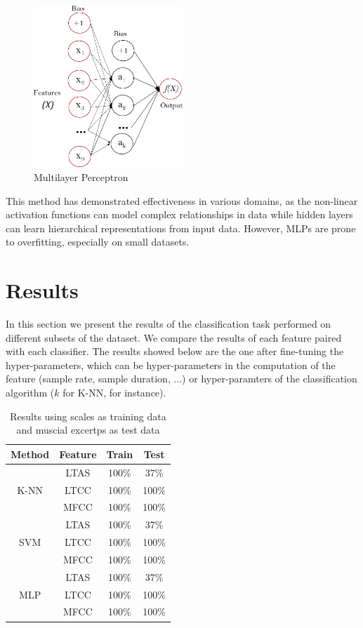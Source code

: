\documentclass[letterpaper,11pt,leqno]{article}
\begin{document}
\begin{figure}[H]
	\includegraphics[width=0.5\textwidth]{../figures/multilayerperceptron_network.png}
	\caption{Multilayer Perceptron}
	\label{f:mlp}
\end{figure}

This method has demonstrated effectiveness in various domains, as the non-linear activation functions can model complex relationships in data while hidden layers can learn hierarchical representations from input data. However, MLPs are prone to overfitting, especially on small datasets.

\section{Results}\label{s:results}

In this section we present the results of the classification task performed on different subsets of the dataset. We compare the results of each feature paired with each classifier. The results showed below are the one after fine-tuning the hyper-parameters, which can be hyper-parameters in the computation of the feature (sample rate, sample duration, ...) or hyper-paramters of the classification algorithm ($k$ for K-NN, for instance).

\begin{table}[H]
\caption{Results using scales as training data and muscial excertps as test data}  
\centering
	\begin{tabular}{c c c c}
		\textbf{Method} & \textbf{Feature} & \textbf{Train} & \textbf{Test} \\
		\hline\hline
		\multirow{3}{3em}{K-NN} & LTAS & 100\% & 37\% \\
		& LTCC & 100\% & 100\% \\
		& MFCC & 100\% & 100\% \\
		\hline
		\multirow{3}{3em}{SVM} & LTAS & 100\% & 37\% \\
		& LTCC & 100\% & 100\% \\
		& MFCC & 100\% & 100\% \\
		\hline
		\multirow{3}{3em}{MLP} & LTAS & 100\% & 37\% \\
		& LTCC & 100\% & 100\% \\
		& MFCC & 100\% & 100\% \\
		\hline
	\end{tabular}
\end{table}
\end{document}

